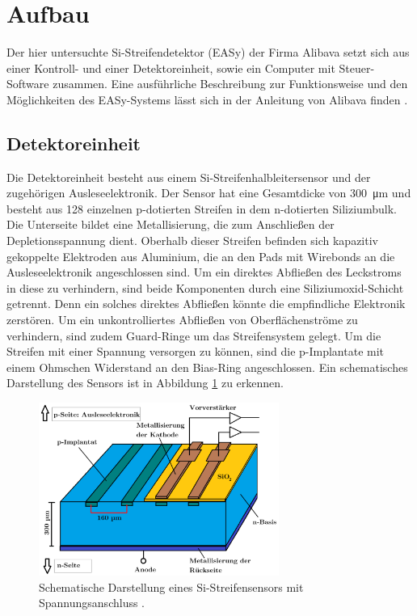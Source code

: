 \newpage
\section{Aufbau}
\label{sec:Aufbau}
Der hier untersuchte Si-Streifendetektor (EASy) der Firma Alibava setzt sich aus einer Kontroll- und einer Detektoreinheit, sowie ein Computer mit Steuer-Software zusammen. Eine ausführliche Beschreibung zur Funktionsweise und den Möglichkeiten des EASy-Systems lässt sich in der Anleitung von Alibava finden \cite{alibava}.

\subsection{Detektoreinheit}
\label{sec:Detektoreinheit}
 Die Detektoreinheit besteht aus einem Si-Streifenhalbleitersensor und der zugehörigen Ausleseelektronik. Der Sensor hat eine Gesamtdicke von \SI{300}{\micro\meter} und besteht aus 128 einzelnen p-dotierten Streifen in dem n-dotierten Siliziumbulk. Die Unterseite bildet eine Metallisierung, die zum Anschließen der Depletionsspannung dient. Oberhalb dieser Streifen befinden sich kapazitiv gekoppelte Elektroden aus Aluminium, die an den Pads mit Wirebonds an die Ausleseelektronik angeschlossen sind. Um ein direktes Abfließen des Leckstroms in diese zu verhindern, sind beide Komponenten durch eine Siliziumoxid-Schicht getrennt. Denn ein solches direktes Abfließen könnte die empfindliche Elektronik zerstören. Um ein unkontrolliertes Abfließen von Oberflächenströme zu verhindern, sind zudem Guard-Ringe um das Streifensystem gelegt. Um die Streifen mit einer Spannung versorgen zu können, sind die p-Implantate mit einem Ohmschen Widerstand an den Bias-Ring angeschlossen.
 Ein schematisches Darstellung des Sensors ist in Abbildung \ref{fig:schema} zu erkennen.
 \begin{figure}[htb]
   \centering
   \includegraphics[width=0.7\textwidth]{graphics/Schema.png}
   \caption{Schematische Darstellung eines Si-Streifensensors mit Spannungsanschluss \cite{anleitung}.}
   \label{fig:schema}
 \end{figure}
